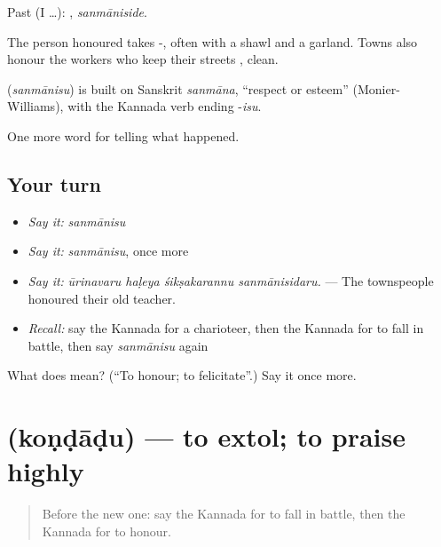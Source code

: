 Past (I …): , \emph{sanmāniside}.

The person honoured takes -, often with a shawl and a garland. Towns also honour the workers who keep their streets , clean.

\begin{cousinweb}
\textbf{} (\emph{sanmānisu}) is built on Sanskrit \emph{sanmāna}, \textquotedblleft{}respect or esteem\textquotedblright{} (Monier-Williams), with the Kannada verb ending -\emph{isu}.
\end{cousinweb}

\begin{grammarlens}[title={What you've built}]
One more word for telling what happened.
\end{grammarlens}

\subsection*{Your turn}
\begin{itemize}
\raggedright
  \item \emph{Say it:} \emph{sanmānisu}
  \item \emph{Say it:} \emph{sanmānisu}, once more
  \item \emph{Say it:} \emph{ūrinavaru haḷeya śikṣakarannu sanmānisidaru.} — The townspeople honoured their old teacher.
  \item \emph{Recall:} say the Kannada for a charioteer, then the Kannada for to fall in battle, then say \emph{sanmānisu} again
\end{itemize}

\begin{tcolorbox}[breakable,colback=teal!4,colframe=teal!35!black,title={Before you move on}]
What does  mean? (\textquotedblleft{}To honour; to felicitate\textquotedblright{}.) Say it once more.
\end{tcolorbox}
\section[\texorpdfstring{\kn{ಕೊಂಡಾಡು} (koṇḍāḍu)}{ಕೊಂಡಾಡು (koṇḍāḍu)}]{ (koṇḍāḍu) — to extol; to praise highly}

\label{lesson:KA-C350-kondadu}



\begin{quote}
Before the new one: say the Kannada for to fall in battle, then the Kannada for to honour.
\end{quote}

